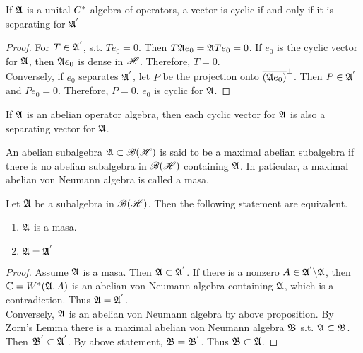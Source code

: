 \documentclass[a4paper,11pt]{report}
\begin{document}
\begin{prop}
	If $\mathfrak{A}$ is a unital $C^{*}$-algebra of operators, a vector is cyclic if and only if it is separating for $\mathfrak{A}^{'}$
\end{prop}
\begin{proof}
	For $T \in \mathfrak{A}^{'}$, s.t. $Te_0 = 0$. Then $T \mathfrak{A} e_0 = \mathfrak{A} T e_0 =  0$. If $e_0$ is the cyclic vector for $\mathfrak{A}$, then $\mathfrak{A} e_0$ is dense in $\mathscr{H}$. Therefore, $T=0$.\\
	Conversely, if $e_0$ separates $\mathfrak{A}^{'}$, let $P$ be the projection onto $\overline{(\mathfrak{A} e_0)}^{\bot}$. Then $P \in \mathfrak{A}^{'}$ and $P e_0 = 0$. Therefore, $P = 0$. $e_0$ is cyclic for $\mathfrak{A}$. 
\end{proof}
\begin{cor}
	If $\mathfrak{A}$ is an abelian operator algebra, then each cyclic vector for $\mathfrak{A}$ is also a separating vector for $\mathfrak{A}$.
\end{cor}

\begin{defn}
	An abelian subalgebra $\mathfrak{A} \subset \mathscr{B(H)}$ is said to be a maximal abelian subalgebra if there is no abelian subalgebra in $\mathscr{B(H)}$ containing $\mathfrak{A}$. In paticular, a maximal abelian von Neumann algebra is called a masa.
\end{defn}

\begin{thm}
	Let $\mathfrak{A}$ be a subalgebra in $\mathscr{B(H)}$. Then the following statement are equivalent.
	\begin{enumerate}[label=\arabic*)]
		\item  $\mathfrak{A}$ is a masa.
		\item $\mathfrak{A} = \mathfrak{A}^{'}$
	\end{enumerate}
\end{thm}
\begin{proof}
	Assume $\mathfrak{A}$ is a masa. Then $\mathfrak{A} \subset \mathfrak{A}^{'}$. If there is a nonzero $A \in \mathfrak{A}^{'} \backslash \mathfrak{A}$, then $\mathbb{C} = W^{*}(\mathfrak{A},A)$ is an abelian von Neumann algebra containing $\mathfrak{A}$, which is a contradiction. Thus $\mathfrak{A} = \mathfrak{A}^{'}$.\\
	Conversely, $\mathfrak{A}$ is an abelian von Neumann algebra by above proposition. By Zorn's Lemma there is a maximal abelian von Neumann algebra $\mathfrak{B}$ s.t. $\mathfrak{A} \subset \mathfrak{B}$. Then $\mathfrak{B}^{'} \subset \mathfrak{A}^{'}$. By above statement, $\mathfrak{B} = \mathfrak{B}^{'}$. Thus $\mathfrak{B} \subset \mathfrak{A}$.
\end{proof}
\end{document}
